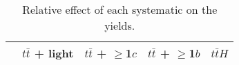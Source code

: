 \documentclass[10pt]{article}
\begin{document}
\begin{table}[htbp]
\begin{center}
\begin{tabular}{|c|c|c|c|c|}
\hline 
      & $t\bar{t}$ + light      & $t\bar{t}$ + $\geq$1$c$      & $t\bar{t}$ + $\geq$1$b$      & $t\bar{t}H$ \\ 
\hline 
\hline 
\end{tabular} 
\caption{Relative effect of each systematic on the yields.} 
\end{center} 
\end{table} 
\end{document}
